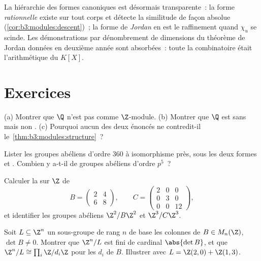 \begin{remark}\label{rem:b3:modules:overview}
La hiérarchie des formes canoniques est désormais transparente~:
la forme \emph{rationnelle} existe sur tout corps et détecte la
similitude de façon absolue (\cref{cor:b3:modules:descent})~; la
forme de \emph{Jordan} en est le raffinement quand $\chi_u$ se
scinde. Les démonstrations par dénombrement de dimensions du
théorème de Jordan données en deuxième année sont absorbées~:
toute la combinatoire était l'arithmétique du  $K[X]$.
\end{remark}

\section{Exercices}

\begin{exercise}[$\star$]\label{exo:b3:modules:1}
(a) Montrer que $\Q$ n'est pas  comme $\Z$-module.
(b) Montrer que $\Q$ est sans  mais non .
(c) Pourquoi aucun des deux énoncés ne contredit-il
le~\cref{thm:b3:modules:structure}~?
\end{exercise}

\begin{exercise}[$\star$]\label{exo:b3:modules:2}
Lister les groupes abéliens d'ordre $360$ à isomorphisme près,
sous les deux formes  et . Combien y a-t-il de groupes abéliens d'ordre
$p^5$~?
\end{exercise}

\begin{exercise}[$\star$]\label{exo:b3:modules:3}
Calculer la  sur $\Z$ de
\[
B = \begin{pmatrix} 2 & 4\\ 6 & 8 \end{pmatrix},
\qquad
C = \begin{pmatrix} 2 & 0 & 0\\ 0 & 3 & 0\\ 0 & 0 & 12
\end{pmatrix},
\]
et identifier les groupes abéliens $\Z^2/B\Z^2$ et $\Z^3/C\Z^3$.
\end{exercise}

\begin{exercise}[$\star\star$]\label{exo:b3:modules:4}
Soit $L \subseteq \Z^n$ un sous-groupe de rang $n$ de base les
colonnes de $B \in M_n(\Z)$, $\det B \neq 0$. Montrer que
$\Z^n/L$ est fini de cardinal $\abs{\det B}$, et que $\Z^n/L
\cong \prod_i \Z/d_i\Z$ pour les  $d_i$ de
$B$. Illustrer avec $L = \Z(2,0) + \Z(1,3)$.
\end{exercise}

